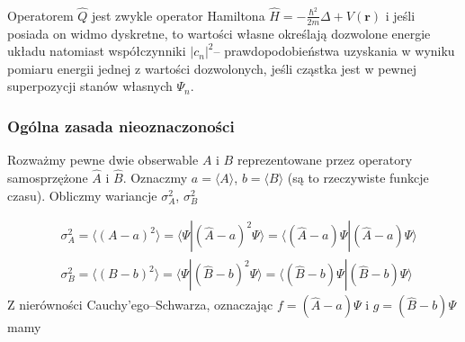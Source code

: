 \documentclass{myclass}
\begin{document}
\noindent{}\\

Operatorem \(\hat{Q}\) jest zwykle operator Hamiltona
\(\hat{H}=-\frac{\hbar^2}{2m}\Delta+V(\mathbf{r})\) i jeśli posiada on widmo dyskretne, to wartości
własne określają dozwolone energie układu natomiast współczynniki \(|c_n|^2\)-- prawdopodobieństwa
uzyskania w wyniku pomiaru energii jednej z wartości dozwolonych, jeśli cząstka jest w pewnej
superpozycji stanów własnych \(\Psi_n\).

\subsubsection{Ogólna zasada nieoznaczoności}

Rozważmy pewne dwie obserwable \(A\) i \(B\) reprezentowane przez operatory samosprzężone
\(\hat{A}\) i \(\hat{B}\). Oznaczmy \(a=\langle A\rangle\), \(b=\langle B\rangle\) (są to
rzeczywiste funkcje czasu). Obliczmy wariancje \(\sigma_A^2\), \(\sigma_B^2\)

\begin{equation*}
\begin{split}
&\sigma_A^2=\langle (A-a)^2\rangle = \langle\Psi | (\hat{A}-a)^2\Psi\rangle=\langle(\hat{A}-a)\Psi | (\hat{A}-a)\Psi\rangle\\
&\sigma_B^2=\langle (B-b)^2\rangle = \langle\Psi | (\hat{B}-b)^2\Psi\rangle=\langle(\hat{B}-b)\Psi | (\hat{B}-b)\Psi\rangle
\end{split}
\end{equation*}
Z nierówności Cauchy'ego--Schwarza, oznaczając \(f=(\hat{A}-a)\Psi\) i \(g=(\hat{B}-b)\Psi\) mamy
\end{document}
